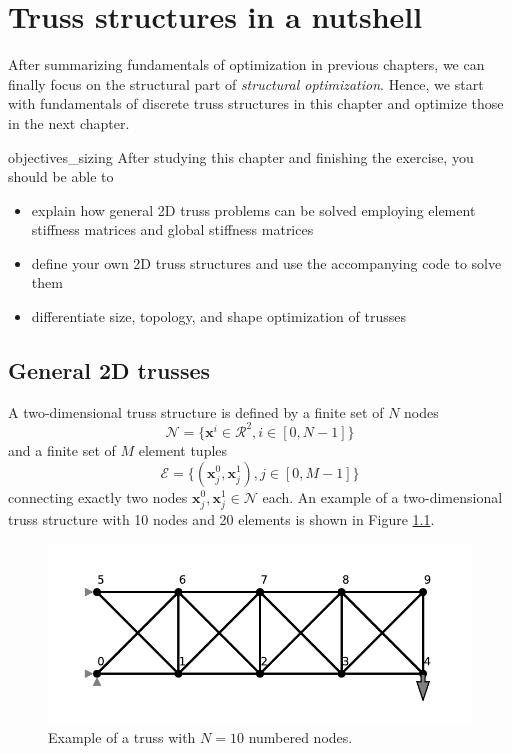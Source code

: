 \chapter{Truss structures in a nutshell}
After summarizing fundamentals of optimization in previous chapters, we can finally focus on the structural part of \emph{structural optimization}. Hence, we start with fundamentals of discrete truss structures in this chapter and optimize those in the next chapter. 


\begin{objectives}{}{objectives_sizing}
After studying this chapter and finishing the exercise, you should be able to 
\begin{itemize}[label=$\dots$]
    \item explain how general 2D truss problems can be solved employing element stiffness matrices and global stiffness matrices
    \item define your own 2D truss structures and use the accompanying code to solve them
    \item differentiate size, topology, and shape optimization of trusses
\end{itemize}
\end{objectives}

\section{General 2D trusses}
A two-dimensional truss structure is defined by a finite set of $N$ nodes 
\begin{equation}
    \mathcal{N}=\{\mathbf{x}^i \in \mathcal{R}^2, i \in [0, N-1]\}
\end{equation} and a finite set of $M$ element tuples 
\begin{equation}
    \mathcal{E} = \{(\mathbf{x}^0_j, \mathbf{x}^1_j), j \in [0, M-1]\}
\end{equation} 
connecting exactly two nodes $\mathbf{x}^0_j,  \mathbf{x}^1_j \in \mathcal{N}$ each. An example of a two-dimensional truss structure with 10 nodes and 20 elements is shown in Figure \ref{fig:truss_example}.

\begin{figure}[!htpb]
    \centering
    \includegraphics[width=\textwidth]{figures/truss_sample.pdf}
    \caption{Example of a truss with $N=10$ numbered nodes.}
    \label{fig:truss_example}
\end{figure}


